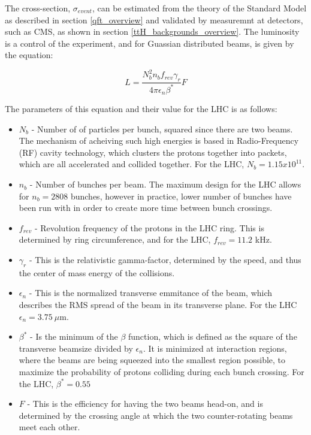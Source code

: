 \noindent  The cross-section, $\sigma_{event}$, can be estimated from the
theory of the Standard Model as described in section
\ref{qft_overview} and validated by measuremnt at detectors, such as
CMS, as shown in section \ref{ttH_backgrounds_overview}.  The
luminosity is a control of the experiment, and for Guassian
distributed beams, is given by the equation:

\begin{equation}\label{eq:lumi}
L = \frac{ N_{b}^{2}n_{b}f_{rev}\gamma_{r}
}{ 4\pi\epsilon_{n}\beta^{\ast} }F
\end{equation}

\noindent The parameters of this equation and their value for the LHC
is as follows:
\begin{itemize}
\item $N_{b}$ - Number of of particles per bunch, squared since there
  are two beams.  The mechanism of acheiving such high energies is
  based in Radio-Frequency (RF) cavity technology, which clusters the
  protons together into packets, which are all accelerated and
  collided together.  For the LHC, $N_{b} = 1.15 x 10^{11}$.
\item $n_{b}$ - Number of bunches per beam.  The maximum design for
  the LHC allows for $n_{b} = 2808$ bunches, however in practice,
  lower number of bunches have been run with in order to create more
  time between bunch crossings.  
\item $f_{rev}$ - Revolution frequency of the protons in the LHC
  ring.  This is determined by ring circumference, and for the LHC,
  $f_{rev} = 11.2$ kHz. 
\item $\gamma_{r}$ - This is the relativistic gamma-factor, determined
  by the speed, and thus the center of mass energy of the collisions.  
\item $\epsilon_{n}$ - This is the normalized transverse emmitance of
  the beam, which describes the RMS spread of the beam in its
  transverse plane.  For the LHC $\epsilon_{n} = 3.75~\mu$m.  
\item $\beta^{\ast}$ - Is the minimum of the $\beta$ function, which
  is defined as the square of the transverse beamsize divided by
  $\epsilon_{n}$.  It is minimized at interaction regions, where the
  beams are being squeezed into the smallest region possible, to
  maximize the probability of protons colliding during each bunch
  crossing.  For the LHC, $\beta^{\ast} = 0.55$ 
\item $F$ - This is the efficiency for having the two beams head-on,
  and is determined by the crossing angle at which the two
  counter-rotating beams meet each other.  
\end{itemize}

